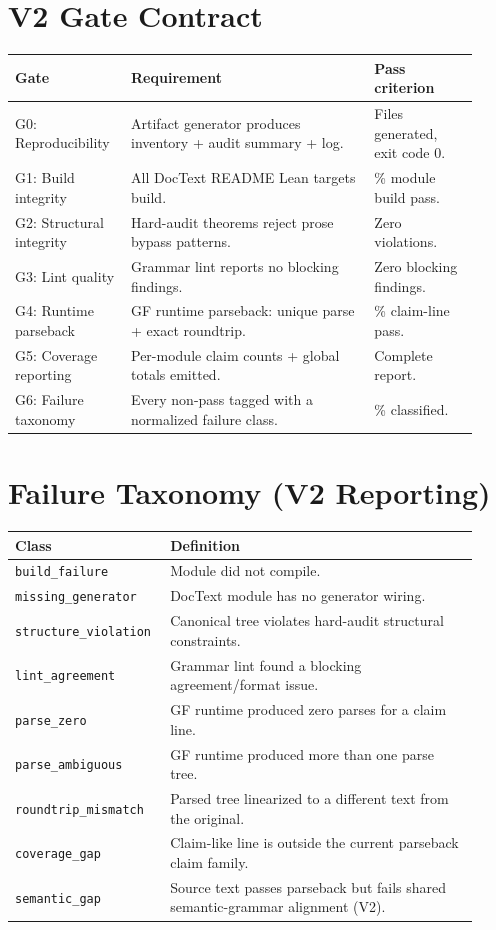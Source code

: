 \documentclass[11pt]{article}
\newcommand{\code}[1]{\texttt{#1}}
\begin{document}
\section{V2 Gate Contract}

\begin{longtable}{>{\raggedright\arraybackslash}p{0.22\linewidth}
                  >{\raggedright\arraybackslash}p{0.49\linewidth}
                  >{\raggedright\arraybackslash}p{0.21\linewidth}}
\toprule
Gate & Requirement & Pass criterion \\
\midrule
G0: Reproducibility & Artifact generator produces inventory + audit summary + log. & Files generated, exit code 0. \\
G1: Build integrity & All DocText README Lean targets build. & 100\% module build pass. \\
G2: Structural integrity & Hard-audit theorems reject prose bypass patterns. & Zero violations. \\
G3: Lint quality & Grammar lint reports no blocking findings. & Zero blocking findings. \\
G4: Runtime parseback & GF runtime parseback: unique parse + exact roundtrip. & 100\% claim-line pass. \\
G5: Coverage reporting & Per-module claim counts + global totals emitted. & Complete report. \\
G6: Failure taxonomy & Every non-pass tagged with a normalized failure class. & 100\% classified. \\
\bottomrule
\end{longtable}

\section{Failure Taxonomy (V2 Reporting)}

\begin{longtable}{>{\raggedright\arraybackslash}p{0.28\linewidth}
                  >{\raggedright\arraybackslash}p{0.64\linewidth}}
\toprule
Class & Definition \\
\midrule
\code{build\_failure} & Module did not compile. \\
\code{missing\_generator} & DocText module has no generator wiring. \\
\code{structure\_violation} & Canonical tree violates hard-audit structural constraints. \\
\code{lint\_agreement} & Grammar lint found a blocking agreement/format issue. \\
\code{parse\_zero} & GF runtime produced zero parses for a claim line. \\
\code{parse\_ambiguous} & GF runtime produced more than one parse tree. \\
\code{roundtrip\_mismatch} & Parsed tree linearized to a different text from the original. \\
\code{coverage\_gap} & Claim-like line is outside the current parseback claim family. \\
\code{semantic\_gap} & Source text passes parseback but fails shared semantic-grammar alignment (V2). \\
\bottomrule
\end{longtable}
\end{document}
